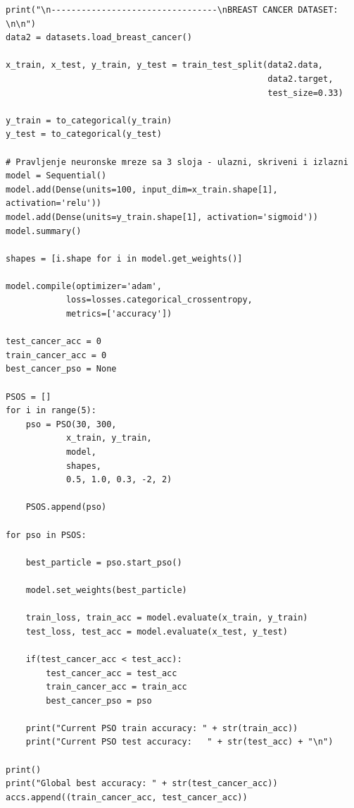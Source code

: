 \documentclass[a4paper]{article}
\begin{document}
\begin{lstlisting}
print("\n---------------------------------\nBREAST CANCER DATASET: \n\n")
data2 = datasets.load_breast_cancer()

x_train, x_test, y_train, y_test = train_test_split(data2.data, 
                                                    data2.target, 
                                                    test_size=0.33)

y_train = to_categorical(y_train)
y_test = to_categorical(y_test)

# Pravljenje neuronske mreze sa 3 sloja - ulazni, skriveni i izlazni
model = Sequential()
model.add(Dense(units=100, input_dim=x_train.shape[1], activation='relu'))
model.add(Dense(units=y_train.shape[1], activation='sigmoid'))
model.summary()

shapes = [i.shape for i in model.get_weights()]

model.compile(optimizer='adam', 
            loss=losses.categorical_crossentropy, 
            metrics=['accuracy'])

test_cancer_acc = 0
train_cancer_acc = 0
best_cancer_pso = None

PSOS = []
for i in range(5):
    pso = PSO(30, 300, 
            x_train, y_train, 
            model, 
            shapes, 
            0.5, 1.0, 0.3, -2, 2)

    PSOS.append(pso)

for pso in PSOS:

    best_particle = pso.start_pso()

    model.set_weights(best_particle)

    train_loss, train_acc = model.evaluate(x_train, y_train)
    test_loss, test_acc = model.evaluate(x_test, y_test)

    if(test_cancer_acc < test_acc): 
        test_cancer_acc = test_acc
        train_cancer_acc = train_acc
        best_cancer_pso = pso

    print("Current PSO train accuracy: " + str(train_acc))
    print("Current PSO test accuracy:   " + str(test_acc) + "\n")

print()
print("Global best accuracy: " + str(test_cancer_acc))
accs.append((train_cancer_acc, test_cancer_acc))
\end{lstlisting}
\end{document}
